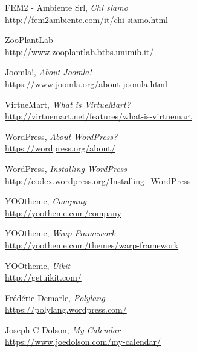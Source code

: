 \begin{thebibliography}{99}

	FEM2 - Ambiente Srl, \emph{Chi siamo} \\
	\url{http://fem2ambiente.com/it/chi-siamo.html}

	ZooPlantLab \\
	\url{http://www.zooplantlab.btbs.unimib.it/}

	Joomla!, \emph{About Joomla!} \\
	\url{https://www.joomla.org/about-joomla.html}

	VirtueMart, \emph{What is VirtueMart?} \\
	\url{http://virtuemart.net/features/what-is-virtuemart}
	
	WordPress, \emph{About WordPress?} \\
	\url{https://wordpress.org/about/}
	
	WordPress, \emph{Installing WordPress} \\
	\url{http://codex.wordpress.org/Installing_WordPress}	
	
	YOOtheme, \emph{Company} \\
	\url{http://yootheme.com/company}	

	YOOtheme, \emph{Wrap Framework} \\
	\url{http://yootheme.com/themes/warp-framework}	
	
	YOOtheme, \emph{Uikit} \\
	\url{http://getuikit.com/}	

	Frédéric Demarle, \emph{Polylang} \\
	\url{https://polylang.wordpress.com/}	

	Joseph C Dolson, \emph{My Calendar} \\
	\url{https://www.joedolson.com/my-calendar/}

	
\end{thebibliography}